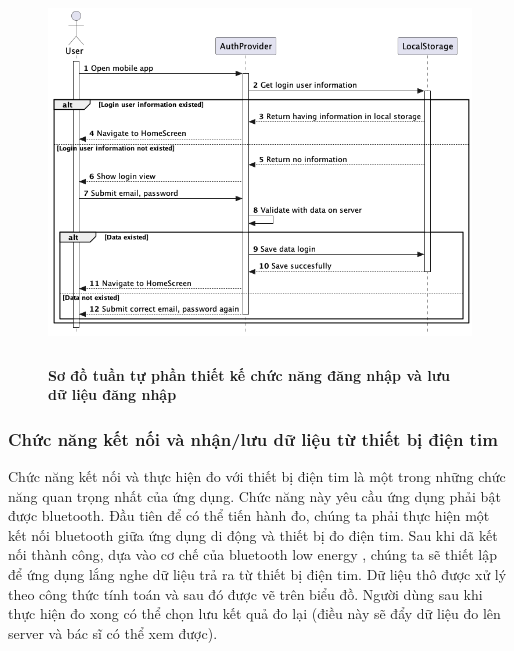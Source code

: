 \begin{figure}[H]
  \centering
  \includegraphics[width=16cm,height=10cm]{Images/mobile_app/design_store_data_login.png}
  \caption[Sơ đồ tuần tự phần thiết kế chức năng đăng nhập và lưu dữ liệu đăng nhập]{\bfseries \fontsize{12pt}{0pt}
  \selectfont Sơ đồ tuần tự phần thiết kế chức năng đăng nhập và lưu dữ liệu đăng nhập}
  \label{seq_auth} %
\end{figure}

\subsubsection{Chức năng kết nối và nhận/lưu dữ liệu từ thiết bị điện tim}
\mbox{}

Chức năng kết nối và thực hiện đo với thiết bị điện tim là một trong những chức năng quan trọng nhất của ứng dụng. Chức năng này yêu cầu
ứng dụng phải bật được bluetooth. Đầu tiên để có thể tiến hành đo, chúng ta phải thực hiện một kết nối bluetooth giữa ứng dụng di động và
thiết bị đo điện tim. Sau khi dã kết nối thành công, dựa vào cơ chế của bluetooth low energy \cite{intro_ble}, chúng ta sẽ thiết lập để ứng dụng lắng
nghe dữ liệu trả ra từ thiết bị điện tim. Dữ liệu thô được xử lý theo công thức tính toán và sau đó được vẽ trên biểu đồ. Người dùng sau
khi thực hiện đo xong có thể chọn lưu kết quả đo lại (điều này sẽ đẩy dữ liệu đo lên server và bác sĩ có thể xem được).

